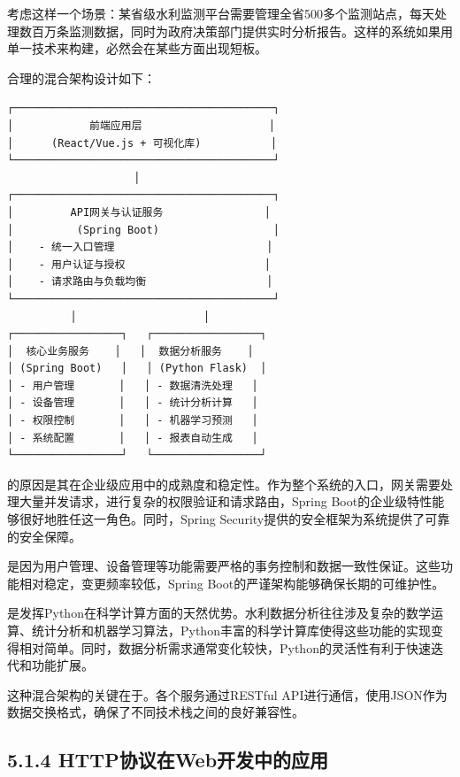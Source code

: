 考虑这样一个场景：某省级水利监测平台需要管理全省500多个监测站点，每天处理数百万条监测数据，同时为政府决策部门提供实时分析报告。这样的系统如果用单一技术来构建，必然会在某些方面出现短板。

合理的混合架构设计如下：

\begin{lstlisting}
┌─────────────────────────────────────────┐
│            前端应用层                    │
│      (React/Vue.js + 可视化库)           │
└─────────────────────────────────────────┘
                    │
┌─────────────────────────────────────────┐
│         API网关与认证服务                │
│          (Spring Boot)                  │
│    - 统一入口管理                        │
│    - 用户认证与授权                      │
│    - 请求路由与负载均衡                   │
└─────────────────────────────────────────┘
          │                    │
┌─────────────────┐   ┌─────────────────┐
│  核心业务服务    │   │  数据分析服务    │
│ (Spring Boot)   │   │ (Python Flask)  │
│ - 用户管理       │   │ - 数据清洗处理   │
│ - 设备管理       │   │ - 统计分析计算   │
│ - 权限控制       │   │ - 机器学习预测   │
│ - 系统配置       │   │ - 报表自动生成   │
└─────────────────┘   └─────────────────┘
\end{lstlisting}

的原因是其在企业级应用中的成熟度和稳定性。作为整个系统的入口，网关需要处理大量并发请求，进行复杂的权限验证和请求路由，Spring Boot的企业级特性能够很好地胜任这一角色。同时，Spring Security提供的安全框架为系统提供了可靠的安全保障。

是因为用户管理、设备管理等功能需要严格的事务控制和数据一致性保证。这些功能相对稳定，变更频率较低，Spring Boot的严谨架构能够确保长期的可维护性。

是发挥Python在科学计算方面的天然优势。水利数据分析往往涉及复杂的数学运算、统计分析和机器学习算法，Python丰富的科学计算库使得这些功能的实现变得相对简单。同时，数据分析需求通常变化较快，Python的灵活性有利于快速迭代和功能扩展。

这种混合架构的关键在于。各个服务通过RESTful API进行通信，使用JSON作为数据交换格式，确保了不同技术栈之间的良好兼容性。

\hypertarget{httpux534fux8baeux5728webux5f00ux53d1ux4e2dux7684ux5e94ux7528}{%
\subsection{5.1.4 HTTP协议在Web开发中的应用}\label{httpux534fux8baeux5728webux5f00ux53d1ux4e2dux7684ux5e94ux7528}}

